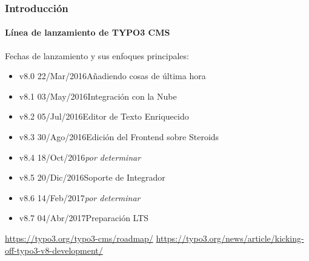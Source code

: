 \begin{frame}[fragile]
	\frametitle{Introducción}
	\framesubtitle{Línea de lanzamiento de TYPO3 CMS}

	Fechas de lanzamiento y sus enfoques principales:

	\begin{itemize}

		\item v8.0 \tabto{1.1cm}22/Mar/2016\tabto{3.4cm}Añadiendo cosas de última hora
		\item
			\begingroup
				\color{typo3orange}
					v8.1 \tabto{1.1cm}03/May/2016\tabto{3.4cm}Integración con la Nube
			\endgroup
		\item v8.2 \tabto{1.1cm}05/Jul/2016\tabto{3.4cm}Editor de Texto Enriquecido
		\item v8.3 \tabto{1.1cm}30/Ago/2016\tabto{3.4cm}Edición del Frontend sobre Steroids
		\item v8.4 \tabto{1.1cm}18/Oct/2016\tabto{3.4cm}\textit{por determinar}
		\item v8.5 \tabto{1.1cm}20/Dic/2016\tabto{3.4cm}Soporte de Integrador
		\item v8.6 \tabto{1.1cm}14/Feb/2017\tabto{3.4cm}\textit{por determinar}
		\item v8.7 \tabto{1.1cm}04/Abr/2017\tabto{3.4cm}Preparación LTS
	\end{itemize}

	\smaller
		\url{https://typo3.org/typo3-cms/roadmap/}\newline
		\url{https://typo3.org/news/article/kicking-off-typo3-v8-development/}
	\normalsize

\end{frame}

